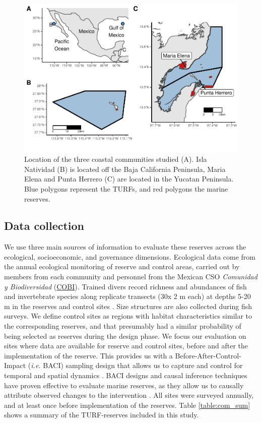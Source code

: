 \documentclass{frontiersSCNS}
\theoremstyle{definition}
\theoremstyle{definition}
\theoremstyle{definition}
\theoremstyle{remark}
\begin{document}
\clearpage

\begin{figure}
\centering
\includegraphics{Villasenor-Derbez_files/figure-latex/unnamed-chunk-1-1.pdf}
\caption{\label{fig:unnamed-chunk-1}\label{fig:map}Location of the three
coastal communities studied (A). Isla Natividad (B) is located off the
Baja California Peninsula, Maria Elena and Punta Herrero (C) are located
in the Yucatan Peninsula. Blue polygons represent the TURFs, and red
polygons the marine reserves.}
\end{figure}

\subsection{Data collection}\label{data-collection}

We use three main sources of information to evaluate these reserves
across the ecological, socioeconomic, and governance dimensions.
Ecological data come from the annual ecological monitoring of reserve
and control areas, carried out by members from each community and
personnel from the Mexican CSO \emph{Comunidad y Biodiversidad}
(\href{www.cobi.org.mx}{COBI}). Trained divers record richness and
abundances of fish and invertebrate species along replicate transects
(30x 2 m each) at depths 5-20 m in the reserves and control sites
\citep{fulton_2018,fulton_2019}. Size structures are also collected
during fish surveys. We define control sites as regions with habitat
characteristics similar to the corresponding reserves, and that
presumably had a similar probability of being selected as reserves
during the design phase. We focus our evaluation on sites where data are
available for reserve and control sites, before and after the
implementation of the reserve. This provides us with a
Before-After-Control-Impact (\emph{i.e.} BACI) sampling design that
allows us to capture and control for temporal and spatial dynamics
\citep{depalma_2018,ferraro_2006-oW}. BACI designs and causal inference
techniques have proven effective to evaluate marine reserves, as they
allow us to causally attribute observed changes to the intervention
\citep{moland_2013-VP,Villasenor-Derbez_2018}. All sites were surveyed
annually, and at least once before implementation of the reserves. Table
\ref{table:com_sum} shows a summary of the TURF-reserves included in
this study.
\end{document}
